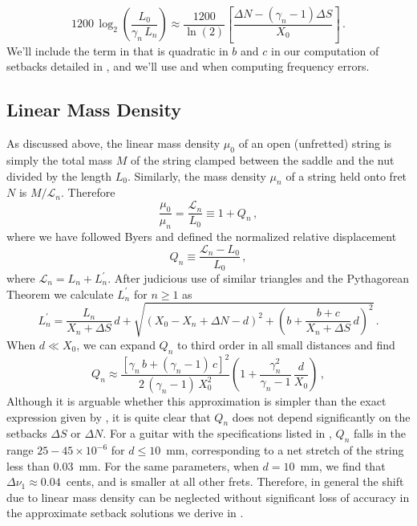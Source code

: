 \begin{equation} \label{eqn:rle_approx}
  1200\, \log_2 \left( \frac{L_0}{\gamma_n\, L_n} \right) \approx \frac{1200}{\ln(2)} \left[ \frac{\Delta N - \left(\gamma_n - 1\right) \Delta S}{X_0}\right]\, .
\end{equation}
We'll include the term in  that is quadratic in $b$ and $c$ in our computation of setbacks detailed in , and we'll use  and  when computing frequency errors.

 \subsection{Linear Mass Density\label{sct:model_lmd}}
As discussed above, the linear mass density $\mu_0$ of an open (unfretted) string is simply the total mass $M$ of the string clamped between the saddle and the nut divided by the length $L_0$. Similarly, the mass density $\mu_n$ of a string held onto fret $N$ is $M/\mathcal{L}_n$. Therefore
 \begin{equation}
\frac{\mu_0}{\mu_n} = \frac{\mathcal{L}_n}{L_0} \equiv 1 + Q_n\, ,
 \end{equation}
where we have followed Byers and defined the normalized relative displacement~\cite{ref:byersgal,ref:byers1996cgi,ref:varieschi2010icf}
 \begin{equation} \label{eqn:q_n_def}
Q_n \equiv \frac{\mathcal{L}_n - L_0}{L_0}\, ,
 \end{equation}
where $\mathcal{L}_n = L_n + L_n^\prime$. After judicious use of similar triangles and the Pythagorean Theorem we calculate $L^\prime_n$ for $n \ge 1$ as
\begin{equation} \label{eqn:l_p_def}
  L^\prime_n = \frac{L_n}{X_n + \Delta S}\, d + \sqrt{\left(X_0 - X_n + \Delta N - d\right)^2 + \left(b + \frac{b + c}{X_n + \Delta S}\, d\right)^2}\, .
\end{equation}
When $d \ll X_0$, we can expand $Q_n$ to third order in all small distances and find
\begin{equation} \label{eqn:q_n_approx}
  Q_n \approx \frac{\left[ \gamma_n\, b + (\gamma_n - 1)\, c \right]^2}{2\, (\gamma_n - 1)\, X_0^2} \left( 1 + \frac{\gamma_n^2}{\gamma_n - 1}\, \frac{d}{X_0} \right)\, ,
\end{equation}
Although it is arguable whether this approximation is simpler than the exact expression given by , it is quite clear that $Q_n$ does not depend significantly on the setbacks $\Delta S$ or $\Delta N$. For a guitar with the specifications listed in , $Q_n$ falls in the range $25 - 45 \times 10^{-6}$ for $d \le 10$~mm, corresponding to a net stretch of the string less than $0.03$~mm. For the same parameters, when $d = 10$~mm, we find that $\Delta \nu_{1} \approx 0.04$~cents, and is smaller at all other frets. Therefore, in general the shift due to linear mass density can be neglected without significant loss of accuracy in the approximate setback solutions we derive in .

